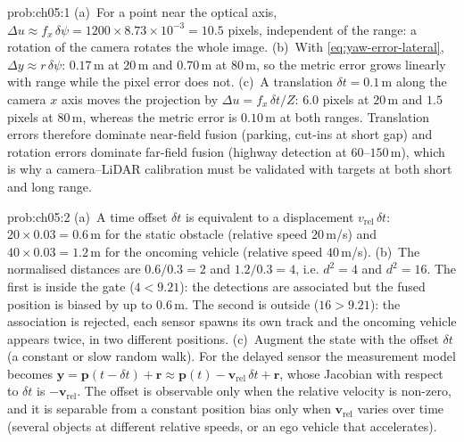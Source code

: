 \begin{sol}{prob:ch05:1}
(a)~For a point near the optical axis, $\Delta u\approx f_{x}\,\delta\psi=1200\times8.73\times10^{-3}=10.5$ pixels, independent of the range: a rotation of the camera rotates the whole image. (b)~With \eqref{eq:yaw-error-lateral}, $\Delta y\approx r\,\delta\psi$: $0.17$\,m at $20$\,m and $0.70$\,m at $80$\,m, so the metric error grows linearly with range while the pixel error does not. (c)~A translation $\delta t=0.1$\,m along the camera $x$ axis moves the projection by $\Delta u=f_{x}\,\delta t/Z$: $6.0$ pixels at $20$\,m and $1.5$ pixels at $80$\,m, whereas the metric error is $0.10$\,m at both ranges. Translation errors therefore dominate near-field fusion (parking, cut-ins at short gap) and rotation errors dominate far-field fusion (highway detection at $60$--$150$\,m), which is why a camera--LiDAR calibration must be validated with targets at both short and long range.
\end{sol}

\begin{sol}{prob:ch05:2}
(a)~A time offset $\delta t$ is equivalent to a displacement $v_{\mathrm{rel}}\,\delta t$: $20\times0.03=0.6$\,m for the static obstacle (relative speed $20$\,m/s) and $40\times0.03=1.2$\,m for the oncoming vehicle (relative speed $40$\,m/s). (b)~The normalised distances are $0.6/0.3=2$ and $1.2/0.3=4$, i.e. $d^{2}=4$ and $d^{2}=16$. The first is inside the gate ($4<9.21$): the detections are associated but the fused position is biased by up to $0.6$\,m. The second is outside ($16>9.21$): the association is rejected, each sensor spawns its own track and the oncoming vehicle appears twice, in two different positions. (c)~Augment the state with the offset $\delta t$ (a constant or slow random walk). For the delayed sensor the measurement model becomes $\mathbf{y}=\mathbf{p}(t-\delta t)+\mathbf{r}\approx\mathbf{p}(t)-\mathbf{v}_{\mathrm{rel}}\,\delta t+\mathbf{r}$, whose Jacobian with respect to $\delta t$ is $-\mathbf{v}_{\mathrm{rel}}$. The offset is observable only when the relative velocity is non-zero, and it is separable from a constant position bias only when $\mathbf{v}_{\mathrm{rel}}$ varies over time (several objects at different relative speeds, or an ego vehicle that accelerates).
\end{sol}


